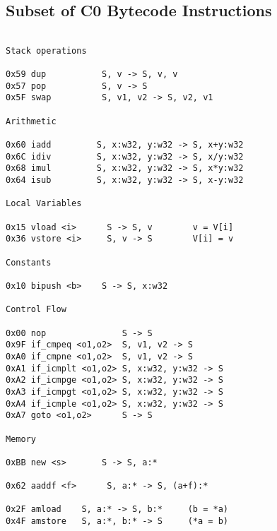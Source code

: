 \subsection{Subset of {\secit C0} Bytecode Instructions}

\begin{verbatim}

Stack operations

0x59 dup           S, v -> S, v, v
0x57 pop           S, v -> S
0x5F swap          S, v1, v2 -> S, v2, v1

Arithmetic

0x60 iadd         S, x:w32, y:w32 -> S, x+y:w32
0x6C idiv         S, x:w32, y:w32 -> S, x/y:w32
0x68 imul         S, x:w32, y:w32 -> S, x*y:w32
0x64 isub         S, x:w32, y:w32 -> S, x-y:w32

Local Variables

0x15 vload <i>      S -> S, v        v = V[i]
0x36 vstore <i>     S, v -> S        V[i] = v

Constants

0x10 bipush <b>    S -> S, x:w32

Control Flow

0x00 nop               S -> S
0x9F if_cmpeq <o1,o2>  S, v1, v2 -> S
0xA0 if_cmpne <o1,o2>  S, v1, v2 -> S
0xA1 if_icmplt <o1,o2> S, x:w32, y:w32 -> S
0xA2 if_icmpge <o1,o2> S, x:w32, y:w32 -> S
0xA3 if_icmpgt <o1,o2> S, x:w32, y:w32 -> S
0xA4 if_icmple <o1,o2> S, x:w32, y:w32 -> S
0xA7 goto <o1,o2>      S -> S

Memory

0xBB new <s>       S -> S, a:*

0x62 aaddf <f>      S, a:* -> S, (a+f):*  

0x2F amload    S, a:* -> S, b:*     (b = *a)
0x4F amstore   S, a:*, b:* -> S     (*a = b)

\end{verbatim}